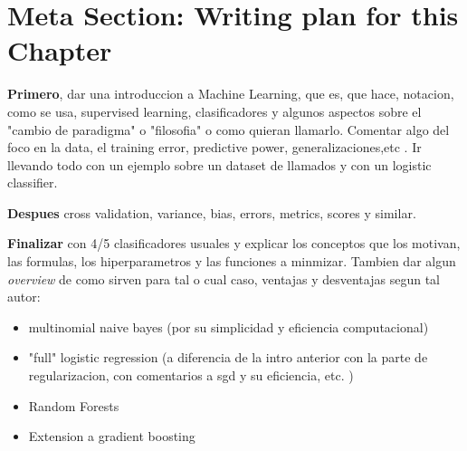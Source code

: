 \section{Meta Section: Writing plan for this Chapter}


\textbf{Primero}, dar una introduccion a Machine Learning, que es, que hace, notacion, como se usa, supervised learning, clasificadores y algunos aspectos sobre el "cambio de paradigma" o "filosofia" o como quieran llamarlo. Comentar algo del foco en la data, el training error, predictive power, generalizaciones,etc . Ir llevando todo con un ejemplo sobre un dataset de llamados y con un logistic classifier.

\textbf{Despues} cross validation, variance, bias, errors, metrics, scores y similar.

\textbf{Finalizar} con 4/5 clasificadores usuales y explicar los conceptos que los motivan, las formulas, los hiperparametros y las funciones a minmizar. Tambien dar algun \textit{overview} de como sirven para tal o cual caso, ventajas y desventajas segun tal autor: 
\begin{itemize}
	\item multinomial naive bayes (por su simplicidad y eficiencia computacional)
	\item "full" logistic regression (a diferencia de la intro anterior con la parte de regularizacion, con comentarios a sgd y su eficiencia, etc. )
	\item Random Forests
	\item Extension a gradient boosting
\end{itemize}
